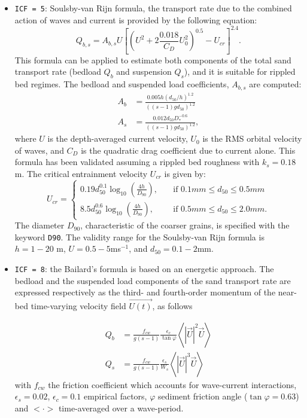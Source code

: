 \begin{itemize}
\item \texttt{ICF = 5}: Soulsby-van Rijn formula, the transport rate due to the combined action of
waves and current is provided by the following equation:
\begin{equation*}
Q_{b,s} = A_{b,s} U\left[ \left( U^2+2\frac{0.018}{C_D} U_0^2\right)^{0.5}-U_{cr}\right]^{2.4}. 
\end{equation*}
This formula can be applied to estimate both components of the total sand
transport rate (bedload $Q_b$ and suspension $Q_s$), and it is suitable for rippled bed
regimes. The bedload and suspended load coefficients, $A_{b,s}$ are computed:
\begin{align*}
A_b &= \frac{0.005 h \left(d_{50}/h\right)^{1.2}}{\left((s-1)gd_{50}\right)^{1.2}} \\
A_s &= \frac{0.012 d_{50}D_*^{-0.6}}{\left((s-1)gd_{50}\right)^{1.2}},
\end{align*}
where $U$ is the depth-averaged current velocity, $U_0$ is the RMS orbital velocity of waves, and 
$C_D$ is the quadratic drag coefficient due to current alone. This formula has been validated assuming a rippled bed roughness with $k_s = 0.18$ m. The critical entrainment velocity $U_{cr}$ is given by:
\begin{equation*}
U_{cr} = \left\{\begin{array}{ll}
\displaystyle
0.19 d_{50}^{0.1}\log_{10}\left(\frac{4h}{D_{90}}\right), & \quad \text{if } 0.1 mm\leq d_{50}\leq 0.5 mm \\
\displaystyle
8.5 d_{50}^{0.6} \log_{10}\left(\frac{4h}{D_{90}} \right), & \quad \text{if } 0.5 mm\leq d_{50}\leq 2.0 mm.
\end{array}
\right.
\end{equation*}
The diameter $D_{90}$, characteristic of the coarser grains, is specified with the keyword \texttt{D90}. The validity range for the Soulsby-van Rijn formula is $h = 1-20$ m, $U = 0.5-5$ms$^{-1}$, and $d_{50}=0.1-2$mm.

\item \texttt{ICF = 8}: the Bailard's formula is based on an energetic approach. The bedload and
the suspended load components of the sand transport rate are expressed
respectively as the third- and fourth-order momentum of the near-bed
time-varying velocity field $\overrightarrow{U(t)}$, as follows

\begin{align*}
Q_b &= \frac{f_{cw}}{g(s-1)} \frac{\epsilon_c}{\tan \varphi}
\left\langle \left| \overrightarrow{U} \right|^2 \overrightarrow{U}
\right\rangle \\
Q_s &= \frac{f_{cw}}{g(s-1)} \frac{\epsilon_s}{W_s} \left\langle
\left| \overrightarrow{U} \right|^3 \overrightarrow{U} \right\rangle 
\end{align*}
with $f_{cw}$ the friction coefficient which accounts
for wave-current interactions, $\epsilon_s  = 0.02$, $\epsilon_c = 0.1$ empirical
factors, $\varphi$ sediment friction angle ($\tan \varphi = 0.63$)  and $<\cdot>$ time-averaged over a wave-period.


\end{itemize}
